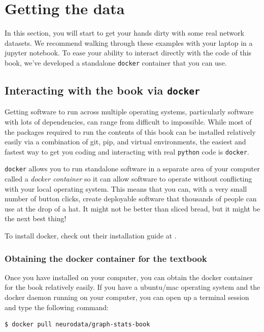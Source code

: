 \section{Getting the data}
\label{sec:ch2:getdata}

In this section, you will start to get your hands dirty with some real network datasets. We recommend walking through these examples with your laptop in a jupyter notebook. To ease your ability to interact directly with the code of this book, we've developed a standalone \texttt{docker} container that you can use. 

\subsection{Interacting with the book via \texttt{docker}}

Getting software to run across multiple operating systems, particularly software with lots of dependencies, can range from difficult to impossible. While most of the packages required to run the contents of this book can be installed relatively easily via a combination of git, pip, and virtual environments, the easiest and fastest way to get you coding and interacting with real \texttt{python} code is \texttt{docker}. 

\texttt{docker} allows you to run standalone software in a separate area of your computer called a \textit{docker container} so it can allow software to operate without conflicting with your local operating system. This means that you can, with a very small number of button clicks, create deployable software that thousands of people can use at the drop of a hat. It might not be better than sliced bread, but it might be the next best thing! 

To install docker, check out their installation guide at \cite{dockerinstall}. 

\subsubsection*{Obtaining the docker container for the textbook}

Once you have  installed on your computer, you can obtain the docker container for the book relatively easily. If you have a ubuntu/mac operating system and the docker daemon running on your computer, you can open up a terminal session and type the following command:

\begin{lstlisting}[style=bash]
$ docker pull neurodata/graph-stats-book
\end{lstlisting}

